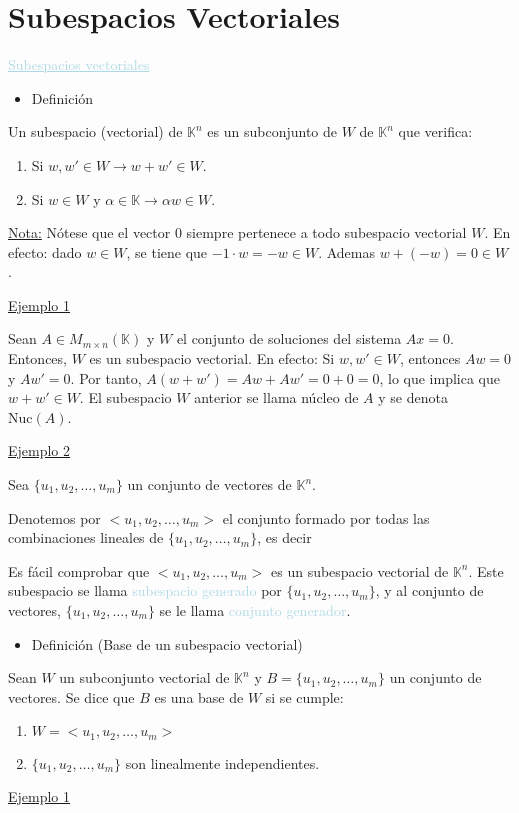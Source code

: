 \documentclass[12pt]{article}
\begin{document}
\newpage
\section{Subespacios Vectoriales}
\textcolor{lightblue}{\underline{Subespacios vectoriales}}
\begin{itemize}[label=\color{red}\textbullet, leftmargin=*]
    \item \color{lightblue}Definición
\end{itemize}
Un subespacio (vectorial) de $\mathbb{K}^n$ es un subconjunto de $W$ de $\mathbb{K}^n$ que verifica:
\begin{enumerate}[label=\arabic*)]
    \item Si $w,w'\in W\longrightarrow w+w'\in W$.
    \item Si $w\in W$ y $\alpha\in\mathbb{K}\longrightarrow\alpha w\in W$.
\end{enumerate}
\underline{Nota:} Nótese que el vector 0 siempre pertenece a todo subespacio vectorial $W$. En efecto: dado $w\in W$, se tiene que $-1\cdot w=-w\in W$. Ademas $w+(-w)=0\in W$.

\underline{Ejemplo 1}

Sean $A\in M_{m\times n}(\mathbb{K})$ y $W$ el conjunto de soluciones del sistema $Ax=0$. Entonces, $W$ es un subespacio vectorial. En efecto: Si $w,w'\in W$, entonces $Aw=0$ y $Aw'=0$. Por tanto, $A(w+w')=Aw+Aw'=0+0=0$, lo que implica que $w+w'\in W$. El subespacio $W$ anterior se llama núcleo de $A$ y se denota $\mathrm{Nuc}(A)$.

\underline{Ejemplo 2}

Sea $\{u_{1},u_{2},\hdots,u_m\}$ un conjunto de vectores de $\mathbb{K}^n$.

Denotemos por $<u_1,u_2,\hdots,u_m>$ el conjunto formado por todas las combinaciones lineales de $\{u_{1},u_{2},\hdots,u_m\}$, es decir \begin{center}
\end{center}
Es fácil comprobar que $<u_1,u_2,\hdots,u_m>$ es un subespacio vectorial de $\mathbb{K}^n$. Este subespacio se llama \textcolor{lightblue}{subespacio generado} por   $\{u_{1},u_{2},\hdots,u_m\}$, y al conjunto de vectores, $\{u_{1},u_{2},\hdots,u_m\}$ se le llama \textcolor{lightblue}{conjunto generador}.
\begin{itemize}[label=\color{red}\textbullet, leftmargin=*]
    \item \color{lightblue} Definición (Base de un subespacio vectorial)
\end{itemize}
Sean $W$ un subconjunto vectorial de $\mathbb{K}^n$ y $B=\{u_{1},u_{2},\hdots,u_m\}$ un conjunto de vectores. Se dice que $B$ es una base de $W$ si se cumple:
\begin{enumerate}[label=\arabic*)]
    \item $W=<u_1,u_2,\hdots,u_m>$
    \item $\{u_{1},u_{2},\hdots,u_m\}$ son linealmente independientes.
\end{enumerate}
\underline{Ejemplo 1}
\end{document}
